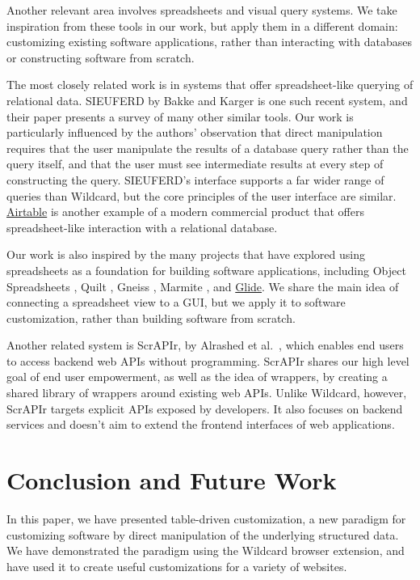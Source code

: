 \documentclass[sigplan,screen,10pt,anonymous,review]{acmart}
\begin{document}
Another relevant area involves spreadsheets and visual query systems. We
take inspiration from these tools in our work, but apply them in a
different domain: customizing existing software applications, rather
than interacting with databases or constructing software from scratch.

The most closely related work is in systems that offer spreadsheet-like
querying of relational data. SIEUFERD by Bakke and Karger
\citep{bakke2016} is one such recent system, and their paper presents a
survey of many other similar tools. Our work is particularly influenced
by the authors' observation that direct manipulation requires that the
user manipulate the results of a database query rather than the query
itself, and that the user must see intermediate results at every step of
constructing the query. SIEUFERD's interface supports a far wider range
of queries than Wildcard, but the core principles of the user interface
are similar. \href{https://airtable.com/}{Airtable} is another example
of a modern commercial product that offers spreadsheet-like interaction
with a relational database.

Our work is also inspired by the many projects that have explored using
spreadsheets as a foundation for building software applications,
including Object Spreadsheets \citep{mccutchen2016}, Quilt
\citep{benson2014}, Gneiss \citep{chang2014}, Marmite \citep{wong2007},
and \href{https://www.glideapps.com/}{Glide}. We share the main idea of
connecting a spreadsheet view to a GUI, but we apply it to software
customization, rather than building software from scratch.

Another related system is ScrAPIr, by Alrashed et
al.~\citep{alrashed2020}, which enables end users to access backend web
APIs without programming. ScrAPIr shares our high level goal of end user
empowerment, as well as the idea of wrappers, by creating a shared
library of wrappers around existing web APIs. Unlike Wildcard, however,
ScrAPIr targets explicit APIs exposed by developers. It also focuses on
backend services and doesn't aim to extend the frontend interfaces of
web applications.

\hypertarget{sec:conclusion}{%
\section{Conclusion and Future Work}\label{sec:conclusion}}

In this paper, we have presented table-driven customization, a new
paradigm for customizing software by direct manipulation of the
underlying structured data. We have demonstrated the paradigm using the
Wildcard browser extension, and have used it to create useful
customizations for a variety of websites.
\end{document}
